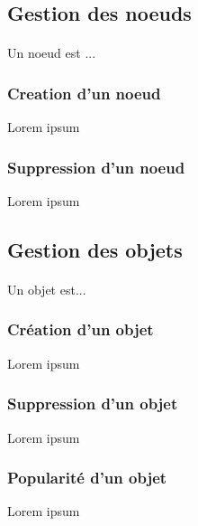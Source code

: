 \documentclass[12pt]{article}
\begin{document}
\subsection{Gestion des noeuds}

\paragraph{} Un noeud est ...

\subsubsection{Creation d'un noeud}
Lorem ipsum


\subsubsection{Suppression d'un noeud}
Lorem ipsum


\subsection{Gestion des objets}

\paragraph{} Un objet est...

\subsubsection{Création d'un objet}
Lorem ipsum

\subsubsection{Suppression d'un objet}
Lorem ipsum

\subsubsection{Popularité d'un objet}
Lorem ipsum


\end{document}
